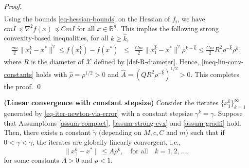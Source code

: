 \documentclass[final,numbook]{svjour3}
\begin{document}
\begin{proof}
\begin{eqnarray*}
\end{eqnarray*}
Using the bounds \eqref{eq-hessian-bounds} on the Hessian of $f_i$, we have $cmI \preceq \nabla^2 f(x) \preceq CmI$ for all $x\in {\mathbb R}^n$. This implies the following strong convexity-based inequalities, for all $k \geq {\hat{k}}$,
   \begin{eqnarray*} \frac{cm}{2}\|x_1^k - x^*\|^2 \leq f(x_1^k) - f(x^*) &\leq&  \frac{Cm}{2} \|x_1^{\hat{k}} - x^*\|^2 \rho^{k-{\hat{k}}} \nonumber \leq \frac{Cm}{2}R^2  \rho^{-{\hat{k}}} \rho^{k},
   \end{eqnarray*}
where $R$ is the diameter of $\mathcal{X}$ defined by \eqref{def-R-diameter}. Hence, \eqref{ineq-lin-conv-constants} holds with ${\hat{\rho}} = {\rho}^{1/2} > 0$ and ${\hat{A}}=({QR^2\rho^{-{\hat{k}}}})^{1/2}> 0$. This completes the proof. \qed         
\end{proof}
\begin{theorem} \textbf{(Linear convergence with constant stepsize)} Consider the iterates $\{x_1^k\}_{k=1}^\infty$ generated by  \eqref{eq-iter-newton-via-error} with a constant stepsize $\gamma^k =\gamma$. Suppose that Assumptions \ref{assum-compact}, \ref{assum-strong-cvx} and \ref{assum-gradfi} hold. Then, there exists a constant $\widetilde{\gamma}$ (depending on $M,{c},{C}$ and $m$) such that if $0 < \gamma < \widetilde{\gamma}$, the iterates are globally linearly convergent, i.e.,
 \begin{equation}\label{ineq-global-lin-conv-constant-step} \|x_1^k - x^*\| \leq A \rho^k, \quad \mbox{for all} \quad k=1,2,\dots,
 \end{equation}
for some constants $A>0$ and $\rho<1$. 
\end{theorem}
\end{document}
